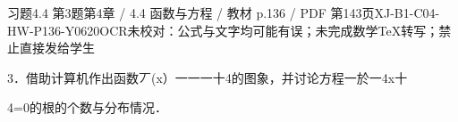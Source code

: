 \begin{bankitem}{习题4.4 第3题}{第4章 / 4.4 函数与方程 / 教材 p.136 / PDF 第143页}{XJ-B1-C04-HW-P136-Y0620}{OCR未校对：公式与文字均可能有误；未完成数学TeX转写；禁止直接发给学生}
\begin{ocrdraft}
\par
3．借助计算机作出函数丆(x）一一一十4的图象，并讨论方程一於一4x十
\par
4=0的根的个数与分布情况．
\end{ocrdraft}
\end{bankitem}

